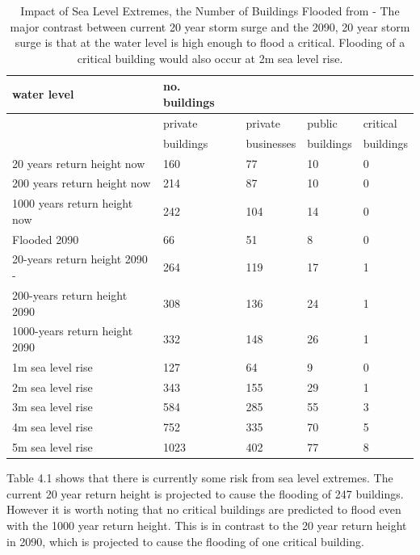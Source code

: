 \begin{table}[h!]
    \centering
    \begin{tabular}{|l|l|l|l|l|}
    \hline
        water level & no. buildings  & ~ & ~ & ~ \\ \hline
        ~ & private & private & public  & critical  \\ \newline
        ~ & buildings & businesses & buildings & buildings \\ \hline        
        20 years return height now & 160 & 77 & 10 & 0 \\ \hline
        200 years return height now & 214 & 87 & 10 & 0 \\ \hline
        1000 years return height now & 242 & 104 & 14 & 0 \\ \hline
        Flooded 2090 & 66 & 51 & 8 & 0 \\ \hline
        20-years return height 2090 -& 264 & 119 & 17 & 1 \\ \hline
        200-years return height  2090 & 308 & 136 & 24 & 1 \\ \hline
        1000-years return height  2090 & 332 & 148 & 26 & 1 \\ \hline
        1m sea level rise & 127 & 64 & 9 & 0 \\ \hline
        2m sea level rise & 343 & 155 & 29 & 1 \\ \hline
        3m sea level rise & 584 & 285 & 55 & 3 \\ \hline
        4m sea level rise & 752 & 335 & 70 & 5 \\ \hline
        5m sea level rise & 1023 & 402 & 77 & 8 \\ \hline
    \end{tabular}
    \caption{Impact of Sea Level Extremes, the Number of Buildings Flooded from \cite{kartverket_se_2021} - The major contrast between current 20 year storm surge and the 2090, 20 year storm surge is that at the water level is high enough to flood a critical. Flooding of a critical building would also occur at 2m sea level rise.}
    \label{building-impact-sle}
\end{table}


Table 4.1 shows that there is currently some risk from sea level extremes. The current 20 year return height is projected to cause the flooding of 247 buildings. However it is worth noting that no critical buildings are predicted to flood even with the 1000 year return height. This is in contrast to the 20 year return height in 2090, which is projected to cause the flooding of one critical building.
